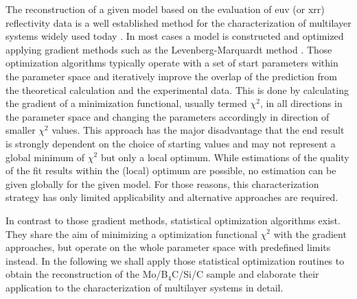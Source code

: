 The reconstruction of a given model based on the evaluation of \gls{euv} (or \gls{xrr}) reflectivity data is a well established method for the characterization of multilayer systems widely used today \cite{lim_fabrication_2001, bajt_investigation_2001, braun_mo/si_2002}. In most cases a model is constructed and optimized applying gradient methods such as the Levenberg-Marquardt method \cite{levenberg_method_1944, marquardt_algorithm_1963}. Those optimization algorithms typically operate with a set of start parameters within the parameter space and iteratively improve the overlap of the prediction from the theoretical calculation and the experimental data. This is done by calculating the gradient of a minimization functional, usually termed $\chi^2$, in all directions in the parameter space and changing the parameters accordingly in direction of smaller $\chi^2$ values. This approach has the major disadvantage that the end result is strongly dependent on the choice of starting values and may not represent a global minimum of $\chi^2$ but only a local optimum. While estimations of the quality of the fit results within the (local) optimum are possible, no estimation can be given globally for the given model. For those reasons, this characterization strategy has only limited applicability and alternative approaches are required.

In contrast to those gradient methods, statistical optimization algorithms exist. They share the aim of minimizing a optimization functional $\chi^2$ with the gradient approaches, but operate on the whole parameter space with predefined limits instead. In the following we shall apply those statistical optimization routines to obtain the reconstruction of the Mo/B$_4$C/Si/C sample and elaborate their application to the characterization of multilayer systems in detail.

